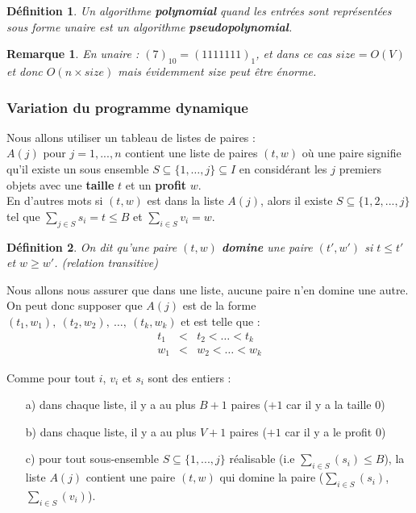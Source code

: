 \documentclass[12pt]{article}
\newtheorem{de}{D\'efinition}[section]
\newtheorem{rem}{Remarque}[section]
\begin{document}
\begin{de}
Un algorithme \textbf{polynomial} quand les entrées sont représentées sous forme unaire est un algorithme \textbf{pseudopolynomial}.
\end{de}

\begin{rem}
En unaire : $(7)_{10} = (1111111)_1$, et dans ce cas $size = O(V)$ et donc $O(n\times size)$ mais évidemment size peut être énorme.
\end{rem}

\subsubsection{Variation du programme dynamique}

Nous allons utiliser un tableau de listes de paires : \\
$A(j)$ pour $j = 1,...,n$ contient une liste de paires $(t,w)$ où une paire signifie qu'il existe un sous ensemble $S\subseteq \{1, \dots, j\} \subseteq I$ en considérant
les $j$ premiers objets avec une \textbf{taille} $t$ et un \textbf{profit} $w$. \\
En d'autres mots si $(t,w)$ est dans la liste $A(j)$, alors il existe $S\subseteq \{1,2,...,j\}$ tel que $\sum_{j\in S} s_i = t \leq B$ et
$\sum_{i\in S} v_i = w$.

\begin{de}
On dit qu'une paire $(t,w)$ \textbf{domine} une paire $(t',w')$ si $t\leq t'$ et
$w \geq w'$. (relation transitive)
\end{de}

Nous allons nous assurer que dans une liste, aucune paire n'en domine une autre. On peut donc supposer que $A(j)$ est de la forme $(t_1,w_1),
\ (t_2,w_2),\ \ldots ,\ (t_k,w_k)$ et est telle que :
\begin{eqnarray}
\nonumber t_1 & < & t_2 < \ldots < t_k \\
\nonumber w_1 & < & w_2 < \ldots < w_k
\end{eqnarray}

\noindent Comme pour tout $i$, $v_i$ et $s_i$ sont des entiers :
\begin{enumerate}
\item[a)] dans chaque liste, il y a au plus $B+1$ paires ($+1$ car il y a la taille $0$)
\item[b)] dans chaque liste, il y a au plus $V+1$ paires ($+1$ car il y a le profit $0$)
\item[c)] pour tout sous-ensemble $S\subseteq \{1,...,j\}$ réalisable (i.e $\sum_{i\in S}(s_i) \leq B$), la liste $A(j)$ contient une paire
$(t,w)$ qui domine la paire ($\sum_{i\in S}(s_i)$,$\sum_{i\in S}(v_i)$).
\end{enumerate}
\end{document}
